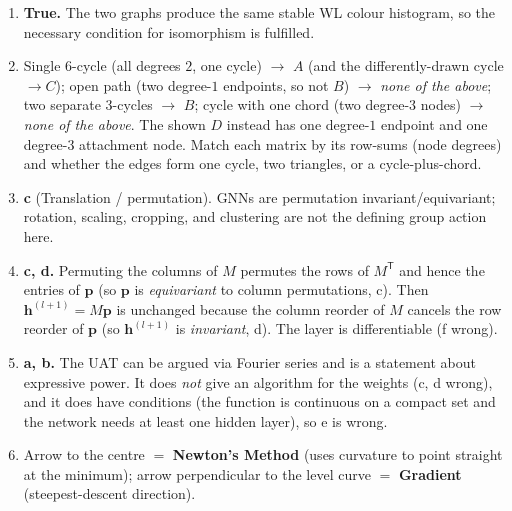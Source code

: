 \documentclass[11pt,oneside]{article}
\newcommand{\T}{^{\mathsf{T}}}
\begin{document}
\begin{enumerate}[label=\textbf{Q\arabic*.}, leftmargin=3em, itemsep=4pt]
        WL test distinguishes them. Not all MPNNs can (expressivity depends on the aggregation), so b is wrong;
        they are not isomorphic (c wrong).
  \item \textbf{True.} The two graphs produce the same stable WL colour histogram, so the necessary
        condition for isomorphism is fulfilled.
  \item Single $6$-cycle (all degrees $2$, one cycle) $\to$ $A$ (and the differently-drawn cycle $\to C$);
        open path (two degree-$1$ endpoints, so not $B$) $\to$ \emph{none of the above}; two separate $3$-cycles $\to$ $B$;
        cycle with one chord (two degree-$3$ nodes) $\to$ \emph{none of the above}. The shown $D$ instead has
        one degree-$1$ endpoint and one degree-$3$ attachment node. Match each matrix by its row-sums
        (node degrees) and whether the edges form one cycle, two triangles, or a cycle-plus-chord.
  \item \textbf{c} (Translation / permutation). GNNs are permutation invariant/equivariant; rotation, scaling,
        cropping, and clustering are not the defining group action here.
  \item \textbf{c, d.} Permuting the columns of $M$ permutes the rows of $M\T$ and hence the entries of
        $\mathbf{p}$ (so $\mathbf{p}$ is \emph{equivariant} to column permutations, c). Then
        $\mathbf{h}^{(l+1)}=M\mathbf{p}$ is unchanged because the column reorder of $M$ cancels the row reorder
        of $\mathbf{p}$ (so $\mathbf{h}^{(l+1)}$ is \emph{invariant}, d). The layer is differentiable (f wrong).
  \item \textbf{a, b.} The UAT can be argued via Fourier series and is a statement about expressive power.
        It does \emph{not} give an algorithm for the weights (c, d wrong), and it does have conditions
        (the function is continuous on a compact set and the network needs at least one hidden layer), so
        e is wrong.
  \item Arrow to the centre $=$ \textbf{Newton's Method} (uses curvature to point straight at the minimum);
        arrow perpendicular to the level curve $=$ \textbf{Gradient} (steepest-descent direction).
\end{enumerate}
\end{document}
